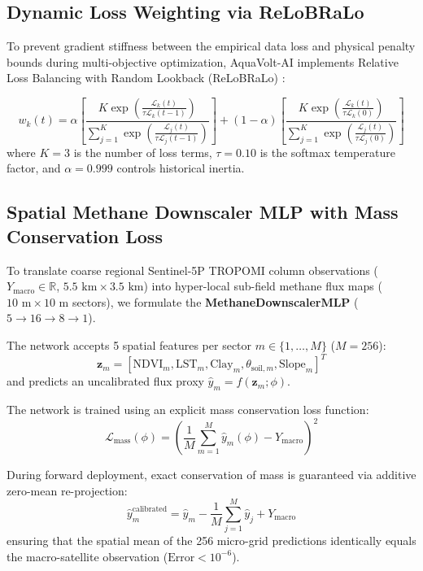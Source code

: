\documentclass[sn-mathphys-num,Numbered]{sn-jnl}
\begin{document}
\subsection{Dynamic Loss Weighting via ReLoBRaLo}\label{sec:methods_relobralo}
To prevent gradient stiffness between the empirical data loss and physical penalty bounds during multi-objective optimization, AquaVolt-AI implements Relative Loss Balancing with Random Lookback (ReLoBRaLo) \cite{Karniadakis2021}:

\begin{equation}
w_k(t) = \alpha \left[ \frac{K \exp\left( \frac{\mathcal{L}_k(t)}{\tau \mathcal{L}_k(t-1)} \right)}{\sum_{j=1}^K \exp\left( \frac{\mathcal{L}_j(t)}{\tau \mathcal{L}_j(t-1)} \right)} \right] + (1 - \alpha) \left[ \frac{K \exp\left( \frac{\mathcal{L}_k(t)}{\tau \mathcal{L}_k(0)} \right)}{\sum_{j=1}^K \exp\left( \frac{\mathcal{L}_j(t)}{\tau \mathcal{L}_j(0)} \right)} \right] \label{eq:relobralo}
\end{equation}
where $K = 3$ is the number of loss terms, $\tau = 0.10$ is the softmax temperature factor, and $\alpha = 0.999$ controls historical inertia.

\subsection{Spatial Methane Downscaler MLP with Mass Conservation Loss}\label{sec:methods_methane_downscaler}
To translate coarse regional Sentinel-5P TROPOMI column observations ($Y_{\text{macro}} \in \mathbb{R}$, $5.5\text{ km} \times 3.5\text{ km}$) into hyper-local sub-field methane flux maps ($10\text{ m} \times 10\text{ m}$ sectors), we formulate the \textbf{MethaneDownscalerMLP} ($5 \to 16 \to 8 \to 1$).

The network accepts 5 spatial features per sector $m \in \{1, \dots, M\}$ ($M = 256$):
$$\mathbf{z}_m = [\mathrm{NDVI}_m, \mathrm{LST}_m, \text{Clay}_{m}, \theta_{\text{soil}, m}, \text{Slope}_m]^T$$
and predicts an uncalibrated flux proxy $\hat{y}_m = f(\mathbf{z}_m; \phi)$.

The network is trained using an explicit mass conservation loss function:
\begin{equation}
\mathcal{L}_{\text{mass}}(\phi) = \left( \frac{1}{M} \sum_{m=1}^M \hat{y}_m(\phi) - Y_{\text{macro}} \right)^2 \label{eq:loss_mass_conservation}
\end{equation}

During forward deployment, exact conservation of mass is guaranteed via additive zero-mean re-projection:
\begin{equation}
\hat{y}_m^{\text{calibrated}} = \hat{y}_m - \frac{1}{M}\sum_{j=1}^M \hat{y}_j + Y_{\text{macro}} \label{eq:mass_reprojection}
\end{equation}
ensuring that the spatial mean of the 256 micro-grid predictions identically equals the macro-satellite observation ($\text{Error} < 10^{-6}$).
\end{document}
